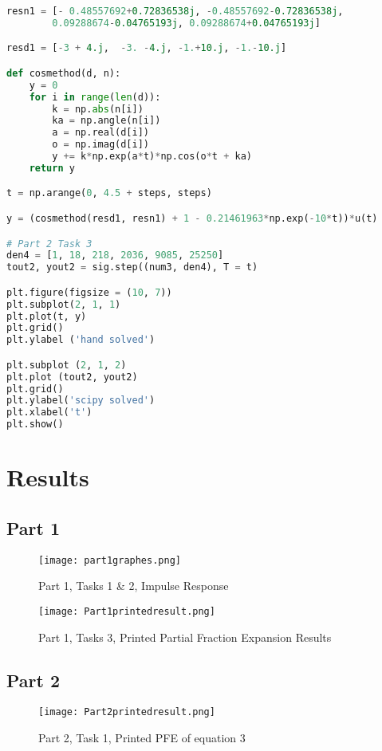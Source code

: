 \documentclass[12pt]{report}
\begin{document}
\begin{lstlisting}[language=Python]
resn1 = [- 0.48557692+0.72836538j, -0.48557692-0.72836538j,
        0.09288674-0.04765193j, 0.09288674+0.04765193j]

resd1 = [-3 + 4.j,  -3. -4.j, -1.+10.j, -1.-10.j]

def cosmethod(d, n):
    y = 0
    for i in range(len(d)):
        k = np.abs(n[i])
        ka = np.angle(n[i])
        a = np.real(d[i])
        o = np.imag(d[i])
        y += k*np.exp(a*t)*np.cos(o*t + ka)
    return y

t = np.arange(0, 4.5 + steps, steps)

y = (cosmethod(resd1, resn1) + 1 - 0.21461963*np.exp(-10*t))*u(t)

# Part 2 Task 3
den4 = [1, 18, 218, 2036, 9085, 25250]
tout2, yout2 = sig.step((num3, den4), T = t)

plt.figure(figsize = (10, 7))
plt.subplot(2, 1, 1)
plt.plot(t, y)
plt.grid()
plt.ylabel ('hand solved')

plt.subplot (2, 1, 2)
plt.plot (tout2, yout2)
plt.grid()
plt.ylabel('scipy solved')
plt.xlabel('t')
plt.show()
\end{lstlisting}
\section{Results}

\subsection{Part 1}
\begin{figure}[H]
\begin{center}
\caption{Part 1, Tasks 1 \& 2, Impulse Response}
\texttt{[image: part1graphes.png]}
\end{center}
\end{figure}

\begin{figure}[H]
\begin{center}
\caption{Part 1, Tasks 3, Printed Partial Fraction Expansion Results}
\texttt{[image: Part1printedresult.png]}
\end{center}
\end{figure}

\subsection{Part 2}
\begin{figure}[H]
\begin{center}
\caption{Part 2, Task 1, Printed PFE of equation 3}
\texttt{[image: Part2printedresult.png]}
\end{center}
\end{figure}
\end{document}
